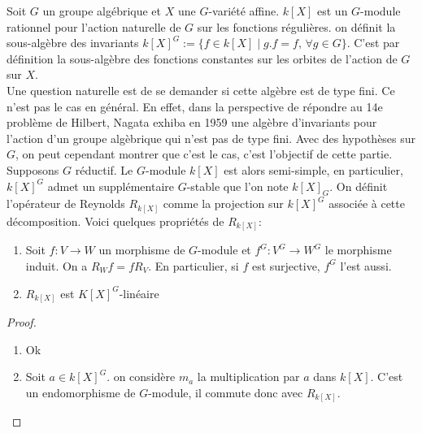 Soit $G$ un groupe algébrique et $X$ une $G$-variété affine. $k[X]$ est un $G$-module rationnel pour l'action naturelle de $G$ sur les fonctions régulières. on définit la sous-algèbre des invariants $k[X]^G:=\lbrace f\in k[X]\mid g.f=f,\, \forall g\in G\rbrace$. C'est par définition la sous-algèbre des fonctions constantes sur les orbites de l'action de $G$ sur $X$.\\
Une question naturelle est de se demander si cette algèbre est de type fini. Ce n'est pas le cas en général. En effet, dans la perspective de répondre au 14e problème de Hilbert, Nagata exhiba en 1959 une algèbre d'invariants pour l'action d'un groupe algèbrique qui n'est pas de type fini. Avec des hypothèses sur $G$, on peut cependant montrer que c'est le cas, c'est l'objectif de cette partie.\\
Supposons $G$ réductif. Le $G$-module $k[X]$ est alors semi-simple, en particulier, $k[X]^G$ admet un supplémentaire $G$-stable que l'on note $k[X]_G$. On définit l'opérateur de Reynolds $R_{k[X]}$ comme la projection sur $k[X]^G$ associée à cette décomposition. Voici quelques propriétés de $R_{k[X]}$:


\begin{prop}\label{reynolds}
\begin{enumerate}
\item Soit $f:V \rightarrow W$ un morphisme de $G$-module et $f^G:V^G \rightarrow W^G$ le morphisme induit. On a $R_Wf=fR_V$. En particulier, si $f$ est surjective, $f^G$ l'est aussi.
\item $R_{k[X]}$ est $K[X]^G$-linéaire
\end{enumerate}

\end{prop}
\begin{proof}
\begin{enumerate}
\item Ok
\item Soit $a\in k[X]^G$. on considère $m_a$ la multiplication par $a$ dans $k[X]$. C'est un endomorphisme de $G$-module, il commute donc avec $R_{k[X]}$. 
\end{enumerate}
\end{proof}

